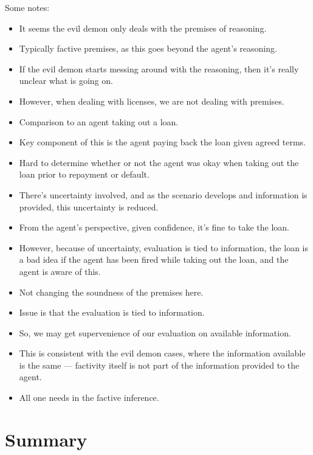 \documentclass[10pt]{article}
\begin{document}
\begin{note}
  Some notes:
  \begin{itemize}
  \item It seems the evil demon only deals with the premises of reasoning.
  \item Typically factive premises, as this goes beyond the agent's reasoning.
  \item If the evil demon starts messing around with the reasoning, then it's really unclear what is going on.
  \item However, when dealing with licenses, we are not dealing with premises.
  \end{itemize}

  \begin{itemize}
  \item Comparison to an agent taking out a loan.
  \item Key component of this is the agent paying back the loan given agreed terms.
  \item Hard to determine whether or not the agent was okay when taking out the loan prior to repayment or default.
  \item There's uncertainty involved, and as the scenario develops and information is provided, this uncertainty is reduced.
  \item From the agent's perspective, given confidence, it's fine to take the loan.
  \item However, because of uncertainty, evaluation is tied to information, the loan is a bad idea if the agent has been fired while taking out the loan, and the agent is aware of this.
  \item Not changing the soundness of the premises here.
  \item Issue is that the evaluation is tied to information.
  \item So, we may get supervenience of our evaluation on available information.
  \item This is consistent with the evil demon cases, where the information available is the same --- factivity itself is not part of the information provided to the agent.
  \item All one needs in the factive inference.
  \end{itemize}
\end{note}

\section{Summary}
\label{sec:summary}
\end{document}
